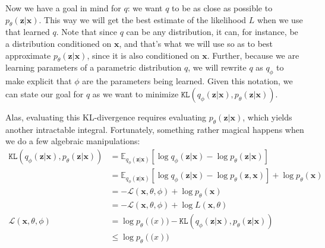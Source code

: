 Now we have a goal in mind for $q$: we want $q$ to be as close as possible to $p_{\theta}(\mathbf{z}|\mathbf{x})$. This way we will get the best estimate of the likelihood $L$ when we use that learned $q$. Note that since $q$ can be any distribution, it can, for instance, be a distribution conditioned on $\mathbf{x}$, and that's what we will use so as to best approximate $p_{\theta}(\mathbf{z}|\mathbf{x})$, since it is also conditioned on $\mathbf{x}$. Further, because we are learning parameters of a parametric distribution $q$, we will rewrite $q$ as $q_{\phi}$ to make explicit that $\phi$ are the parameters being learned. Given this notation, we can state our goal for $q$ as we want to minimize $\texttt{KL}(q_{\phi}(\mathbf{z}|\mathbf{x}), p_{\theta}(\mathbf{z}|\mathbf{x}))$.

Alas, evaluating this KL-divergence requires evaluating $p_{\theta}(\mathbf{z}|\mathbf{x})$, which yields another intractable integral. Fortunately, something rather magical happens when we do a few algebraic manipulations:
\begin{align}
    \texttt{KL}(q_{\phi}(\mathbf{z}|\mathbf{x}), p_{\theta}(\mathbf{z}|\mathbf{x})) &= \mathbb{E}_{q_{\phi}(\mathbf{z}|\mathbf{x})}[\log q_{\phi}(\mathbf{z}|\mathbf{x}) - \log p_{\theta}(\mathbf{z}|\mathbf{x})]\\
    &= \mathbb{E}_{q_{\phi}(\mathbf{z}|\mathbf{x})}[\log q_{\phi}(\mathbf{z}|\mathbf{x}) - \log p_{\theta}(\mathbf{z}, \mathbf{x})] + \log p_{\theta}(\mathbf{x})\\
    &= -\mathcal{L}(\mathbf{x}, \theta, \phi) + \log p_{\theta}(\mathbf{x})\\
    &= -\mathcal{L}(\mathbf{x}, \theta, \phi) + \log L(\mathbf{x}, \theta)\\
    \mathcal{L}(\mathbf{x}, \theta, \phi) &= \log p_{\theta}(\mathbf(x)) - \texttt{KL}(q_{\phi}(\mathbf{z}|\mathbf{x}), p_{\theta}(\mathbf{z}|\mathbf{x}))\\
    &\leq \log p_{\theta}(\mathbf(x))
\end{align}

